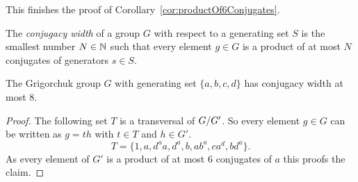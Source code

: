 \documentclass[a4paper,11pt]{amsart}
\begin{document}
This finishes the proof of Corollary~\ref{cor:productOf6Conjugates}.
\begin{defi}
 The \emph{conjugacy width} of a group $G$ with respect to a generating set $S$ 
 is the smallest number $N\in\mathbb{N}$ such that every element $g\in G$ is a product of
 at most $N$ conjugates of generators $s\in S$.
\end{defi}
\begin{cor}
 The Grigorchuk group $G$ with generating set $\{a,b,c,d\}$ has conjugacy width at most $8$.
\end{cor}
\begin{proof}
 The following set $T$ is a transversal of ${G/G'}$. So every element $g\in G$ can be written as $g=th$ with $t\in T$ and $h\in G'$.
 \[T=\{1,a,d^aa,d^a,b,ab^a,ca^d,bd^a\}.\]
 As every element of $G'$ is a product of at most $6$ conjugates of $a$ this proofs the claim.

\end{proof}

\end{document}
